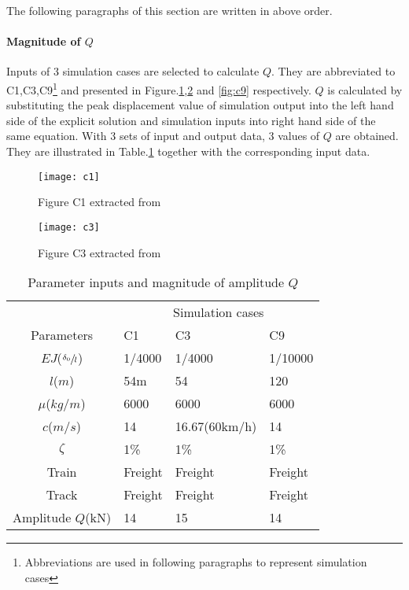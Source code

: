 The following paragraphs of this section are written in above order.

\paragraph{Magnitude of $Q$} Inputs of 3 simulation cases are selected to calculate $Q$. They are abbreviated to C1,C3,C9\footnote{Abbreviations are used in following paragraphs to represent simulation cases } and presented in Figure.\ref{fig:c1},\ref{fig:c3} and \ref{fig:c9} respectively. $Q$ is calculated by substituting the peak displacement value of simulation output into the left hand side of the explicit solution and simulation inputs into right hand side of the same equation. With 3 sets of input and output data, 3 values of $Q$ are obtained. They are illustrated in Table.\ref{tab:parametersetupsandequivalentforce} together with the corresponding input data.


\begin{figure}[h!]
    \centering
    \texttt{[image: c1]}
    \caption{Figure C1 extracted from \citet{d181dt329} }
    \label{fig:c1}
\end{figure}

\begin{figure}[h!]
    \centering
    \texttt{[image: c3]}
    \caption{Figure C3 extracted from \citet{d181dt329} }
    \label{fig:c3}
\end{figure}



\begin{table}[ht!]
    \centering
    \caption{Parameter inputs and magnitude of amplitude $Q$}
    \begin{tabularx}{\textwidth}{c|XXX}
        \hline
        & \multicolumn{3}{c}{Simulation cases}  \\
        Parameters & C1 & C3 & C9 \\
        \hline
        $EJ$($\sfrac{\delta_0}{l}$) & 1/4000 & 1/4000 & 1/10000 \\
        $l$($m$) & 54m & 54 & 120 \\ 
        $\mu$($kg/m$) & 6000 & 6000 & 6000\\
        $c$($m/s$) & 14 & 16.67(60km/h) & 14\\
        $\zeta$ & 1\% & 1\% & 1\%\\
        Train  & Freight & Freight & Freight \\
        Track &  Freight  & Freight & Freight \\
        \hline
        Amplitude $Q$(kN) & 14 & 15 & 14 \\
        \hline
    \end{tabularx}
    \label{tab:parametersetupsandequivalentforce}
\end{table}

